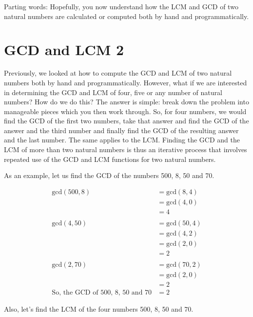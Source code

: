 \documentclass[
]{book}
\begin{document}
Parting words: Hopefully, you now understand how the LCM and GCD of two natural numbers are calculated or computed both by hand and programmatically.

\chapter{GCD and LCM 2}\label{gcd-and-lcm-2}

Previously, we looked at how to compute the GCD and LCM of two natural numbers both by hand and programmatically. However, what if we are interested in determining the GCD and LCM of four, five or any number of natural numbers? How do we do this? The answer is simple: break down the problem into manageable pieces which you then work through. So, for four numbers, we would find the GCD of the first two numbers, take that answer and find the GCD of the answer and the third number and finally find the GCD of the resulting answer and the last number. The same applies to the LCM. Finding the GCD and the LCM of more than two natural numbers is thus an iterative process that involves repeated use of the GCD and LCM functions for two natural numbers.

As an example, let us find the GCD of the numbers 500, 8, 50 and 70.

\[
\begin{aligned}
\text{gcd}(500, 8) &= \text{gcd}(8, 4)  \\
 &= \text{gcd}(4, 0) \\
 &= 4 \\
 \\
\text{gcd}(4, 50) &= \text{gcd}(50, 4) \\
 &= \text{gcd}(4, 2) \\
 &= \text{gcd}(2, 0) \\
 &= 2 \\
 \\
\text{gcd}(2, 70) &= \text{gcd}(70, 2) \\
 &= \text{gcd}(2, 0) \\
 &= 2 \\
\text{So, the GCD of 500, 8, 50 and 70} &= 2
\end{aligned}
\]

Also, let's find the LCM of the four numbers 500, 8, 50 and 70.
\end{document}
